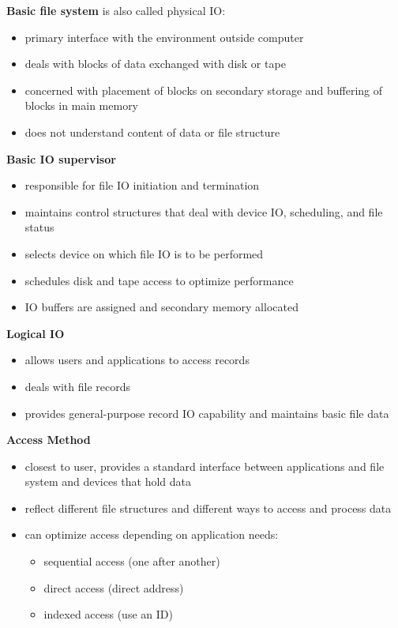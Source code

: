 \documentclass[11pt]{article}
\begin{document}
\textbf{Basic file system} is also called physical IO:
\begin{itemize}
\item primary interface with the environment outside computer
\item deals with blocks of data exchanged with disk or tape
\item concerned with placement of blocks on secondary storage and buffering of blocks in
main memory
\item does not understand content of data or file structure
\end{itemize}

\textbf{Basic IO supervisor}
\begin{itemize}
\item responsible for file IO initiation and termination
\item maintains control structures that deal with device IO, scheduling, and file status
\item selects device on which file IO is to be performed
\item schedules disk and tape access to optimize performance
\item IO buffers are assigned and secondary memory allocated
\end{itemize}

\textbf{Logical IO}
\begin{itemize}
\item allows users and applications to access records
\item deals with file records
\item provides general-purpose record IO capability and maintains basic file data
\end{itemize}

\textbf{Access Method}
\begin{itemize}
\item closest to user, provides a standard interface between applications and file system and
devices that hold data
\item reflect different file structures and different ways to access and process data
\item can optimize access depending on application needs:
\begin{itemize}
\item sequential access (one after another)
\item direct access (direct address)
\item indexed access (use an ID)
\end{itemize}
\end{itemize}
\end{document}
